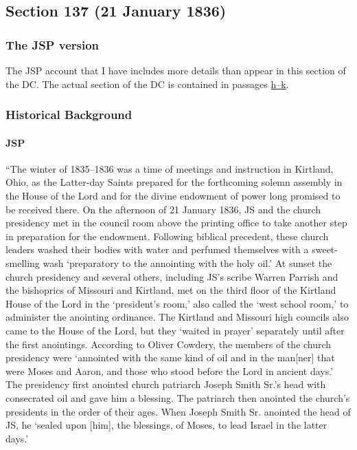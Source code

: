 \subsection{Section 137 (21 January 1836)}
	\label{DC137}
	
	\subsubsection{The JSP version}
	
		The JSP account that I have includes more details than appear in this section of the DC. The actual section of the DC is contained in passages \hyperlink{EMS-1836-JS-21-JAN-1836-h}{h--k}.
	
	\subsubsection{Historical Background}
		\label{DC137-HB}
		
		\paragraph{JSP}
		
			``The winter of 1835--1836 was a time of meetings and instruction in Kirtland, Ohio, as the Latter-day Saints prepared for the forthcoming solemn assembly in the House of the Lord and for the divine endowment of power long promised to be received there. On the afternoon of 21 January 1836, JS and the church presidency met in the council room above the printing office to take another step in preparation for the endowment. Following biblical precedent, these church leaders washed their bodies with water and perfumed themselves with a sweet-smelling wash `preparatory to the annointing with the holy oil.' At sunset the church presidency and several others, including JS's scribe Warren Parrish and the bishoprics of Missouri and Kirtland, met on the third floor of the Kirtland House of the Lord in the `president's room,' also called the `west school room,' to administer the anointing ordinance. The Kirtland and Missouri high councils also came to the House of the Lord, but they `waited in prayer' separately until after the first anointings. According to Oliver Cowdery, the members of the church presidency were `annointed with the same kind of oil and in the man[ner] that were Moses and Aaron, and those who stood before the Lord in ancient days.' The presidency first anointed church patriarch Joseph Smith Sr.'s head with consecrated oil and gave him a blessing. The patriarch then anointed the church's presidents in the order of their ages. When Joseph Smith Sr. anointed the head of JS, he `sealed upon [him], the blessings, of Moses, to lead Israel in the latter days.'
			
